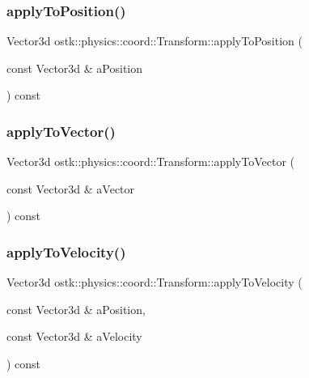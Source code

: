\subsubsection{\texorpdfstring{apply\+To\+Position()}{applyToPosition()}}
{\footnotesize\ttfamily Vector3d ostk\+::physics\+::coord\+::\+Transform\+::apply\+To\+Position (\begin{DoxyParamCaption}\item[{const Vector3d \&}]{a\+Position }\end{DoxyParamCaption}) const}

\mbox{\label{classostk_1_1physics_1_1coord_1_1_transform_a13f0ac6674ecb6748219f4ffc6a23e6e}} 
\subsubsection{\texorpdfstring{apply\+To\+Vector()}{applyToVector()}}
{\footnotesize\ttfamily Vector3d ostk\+::physics\+::coord\+::\+Transform\+::apply\+To\+Vector (\begin{DoxyParamCaption}\item[{const Vector3d \&}]{a\+Vector }\end{DoxyParamCaption}) const}

\mbox{\label{classostk_1_1physics_1_1coord_1_1_transform_a7d57f9e66f59711534ed8ba3e0719995}} 
\subsubsection{\texorpdfstring{apply\+To\+Velocity()}{applyToVelocity()}}
{\footnotesize\ttfamily Vector3d ostk\+::physics\+::coord\+::\+Transform\+::apply\+To\+Velocity (\begin{DoxyParamCaption}\item[{const Vector3d \&}]{a\+Position,  }\item[{const Vector3d \&}]{a\+Velocity }\end{DoxyParamCaption}) const}

